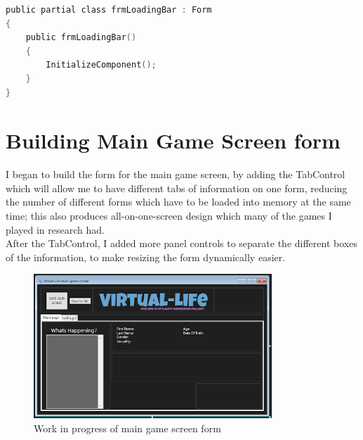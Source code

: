 \begin{lstlisting}[language=c, style=csharp, caption=Code for the loadingbBar form]
public partial class frmLoadingBar : Form
{
    public frmLoadingBar()
    {
        InitializeComponent();
    }
}
\end{lstlisting}

\section{Building Main Game Screen form}
I began to build the form for the main game screen, by adding the TabControl which will allow me to have different tabs of information on one form, reducing the number of different forms which have to be loaded into memory at the same time; this also produces all-on-one-screen design which many of the games I played in research had.\\
After the TabControl, I added more panel controls to separate the different boxes of the information, to make resizing the form dynamically easier.
\begin{figure}[H]
    \centering
    \includegraphics[width=0.8\textwidth]{images/implementation/buildingMainGameScreen.png}
    \caption{Work in progress of main game screen form}
    \label{fig:implementation-buildingMainGameScreen}
\end{figure}

